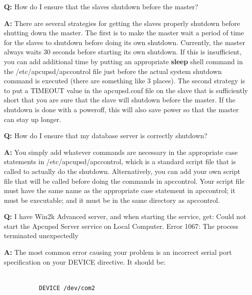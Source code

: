 \begin{description}
\item {\bf Q:}
How do I ensure that the slaves shutdown before the master?  

\item {\bf A:}
There are several strategies for getting the slaves properly shutdown before
shutting down the master. The first is to make the master wait a period of
time for the slaves to shutdown before doing its own shutdown. Currently, the
master always waits 30 seconds before starting its own shutdown. If this is
insufficient, you can add additional time by putting an appropriate {\bf
sleep} shell command in the /etc/apcupsd/apccontrol file just before the
actual system shutdown command is executed (there are something like 3
places). The second strategy is to put a TIMEOUT value in the apcupsd.conf
file on the slave that is sufficiently short that you are sure that the slave
will shutdown before the master. If the shutdown is done with a poweroff, this
will also save power so that the master can stay up longer.  

\item {\bf Q:}
How do I ensure that my database server is correctly shutdown?  

\item {\bf A:}
You simply add whatever commands are necessary in the appropriate case
statements in /etc/apcupsd/apccontrol, which is a standard script file that is
called to actually do the shutdown. Alternatively, you can add your own script
file that will be called before doing the commands in apccontrol. Your script
file must have the same name as the appropriate case statement in apccontrol;
it must be executable; and it must be in the same directory as apccontrol.  

\item {\bf Q:}
I have Win2k Advanced server, and when starting the service, get: Could not
start the Apcupsd Server service on Local Computer. Error 1067: The process
terminated unexpectedly  

\item {\bf A:}
The most common error causing your problem is an incorrect serial port
specification on your DEVICE directive. It should be:  

\footnotesize
\begin{verbatim}
          
          DEVICE /dev/com2
     
\end{verbatim}
\normalsize


\end{description}

